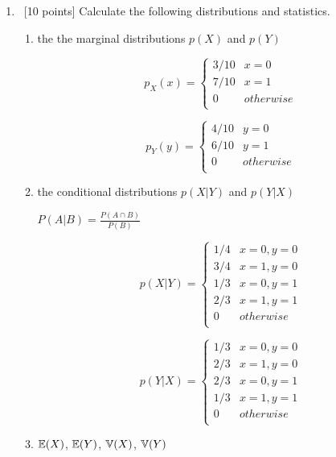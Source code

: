 \documentclass[12pt, fullpage,letterpaper]{article}
\begin{document}
\begin{enumerate}
        \begin{enumerate}
            \item~[10 points] Calculate the following distributions and statistics. 
            \begin{enumerate}
            \item the the marginal distributions $p(X)$ and $p(Y)$
            
            \[
            p_X(x) = 
            \begin{cases} 
            	3/10 & x = 0 \\
            	7/10 & x = 1 \\ 
            	0 & otherwise \\
            \end{cases}
            \]
            
           	\[
            p_Y(y) = 
            \begin{cases} 
            	4/10 & y = 0 \\
            	6/10 & y = 1 \\ 
            	0 & otherwise \\
            \end{cases}
            \]
            
            \item the conditional distributions $p(X|Y)$ and $p(Y|X)$
            
            $P(A|B) = \frac{P(A \cap B)}{P(B)} $
            
            \[
            p(X|Y) = 
            \begin{cases} 
            1/4 & x = 0, y = 0 \\
            3/4 & x = 1, y = 0 \\ 
            1/3 & x = 0, y = 1 \\
            2/3 & x = 1, y = 1 \\
            0 & otherwise \\
            \end{cases}
            \]
            
            \[
            p(Y|X) = 
            \begin{cases} 
            	1/3 & x = 0, y = 0 \\
            	2/3 & x = 1, y = 0 \\ 
            	2/3 & x = 0, y = 1 \\
            	1/3 & x = 1, y = 1 \\
            	0 & otherwise \\
            \end{cases}
            \]
            \item $\mathbb{E}(X)$, $\mathbb{E}(Y)$, $\mathbb{V}(X)$, $\mathbb{V}(Y)$
            

\end{enumerate}
\end{enumerate}
\end{enumerate}
\end{document}
